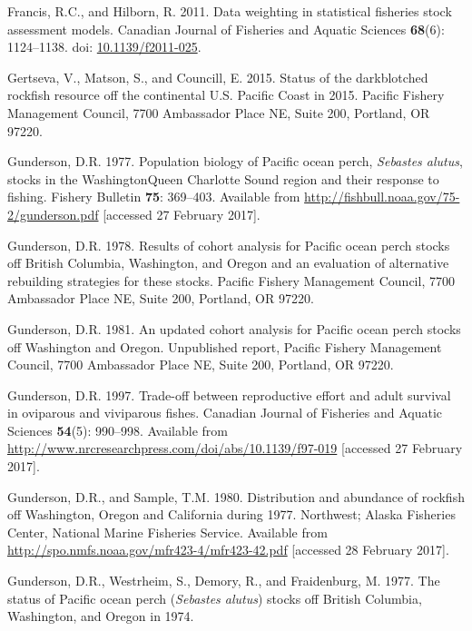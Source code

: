 \documentclass[12pt,]{article}
\begin{document}
\hypertarget{ref-francis_data_2011}{}
Francis, R.C., and Hilborn, R. 2011. Data weighting in statistical
fisheries stock assessment models. Canadian Journal of Fisheries and
Aquatic Sciences \textbf{68}(6): 1124--1138. doi:
\href{https://doi.org/10.1139/f2011-025}{10.1139/f2011-025}.

\hypertarget{ref-gertseva_status_2015}{}
Gertseva, V., Matson, S., and Councill, E. 2015. Status of the
darkblotched rockfish resource off the continental U.S. Pacific Coast in
2015. Pacific Fishery Management Council, 7700 Ambassador Place NE,
Suite 200, Portland, OR 97220.

\hypertarget{ref-gunderson_population_1977}{}
Gunderson, D.R. 1977. Population biology of Pacific ocean perch,
\emph{Sebastes alutus}, stocks in the WashingtonQueen Charlotte Sound
region and their response to fishing. Fishery Bulletin \textbf{75}:
369--403. Available from
\url{http://fishbull.noaa.gov/75-2/gunderson.pdf} {[}accessed 27
February 2017{]}.

\hypertarget{ref-gunderson_results_1978}{}
Gunderson, D.R. 1978. Results of cohort analysis for Pacific ocean perch
stocks off British Columbia, Washington, and Oregon and an evaluation of
alternative rebuilding strategies for these stocks. Pacific Fishery
Management Council, 7700 Ambassador Place NE, Suite 200, Portland, OR
97220.

\hypertarget{ref-gunderson_updated_1981}{}
Gunderson, D.R. 1981. An updated cohort analysis for Pacific ocean perch
stocks off Washington and Oregon. Unpublished report, Pacific Fishery
Management Council, 7700 Ambassador Place NE, Suite 200, Portland, OR
97220.

\hypertarget{ref-gunderson_trade-off_1997}{}
Gunderson, D.R. 1997. Trade-off between reproductive effort and adult
survival in oviparous and viviparous fishes. Canadian Journal of
Fisheries and Aquatic Sciences \textbf{54}(5): 990--998. Available from
\url{http://www.nrcresearchpress.com/doi/abs/10.1139/f97-019}
{[}accessed 27 February 2017{]}.

\hypertarget{ref-gunderson_distribution_1980}{}
Gunderson, D.R., and Sample, T.M. 1980. Distribution and abundance of
rockfish off Washington, Oregon and California during 1977. Northwest;
Alaska Fisheries Center, National Marine Fisheries Service. Available
from \url{http://spo.nmfs.noaa.gov/mfr423-4/mfr423-42.pdf} {[}accessed
28 February 2017{]}.

\hypertarget{ref-gunderson_status_1977}{}
Gunderson, D.R., Westrheim, S., Demory, R., and Fraidenburg, M. 1977.
The status of Pacific ocean perch (\emph{Sebastes alutus}) stocks off
British Columbia, Washington, and Oregon in 1974.
\end{document}
